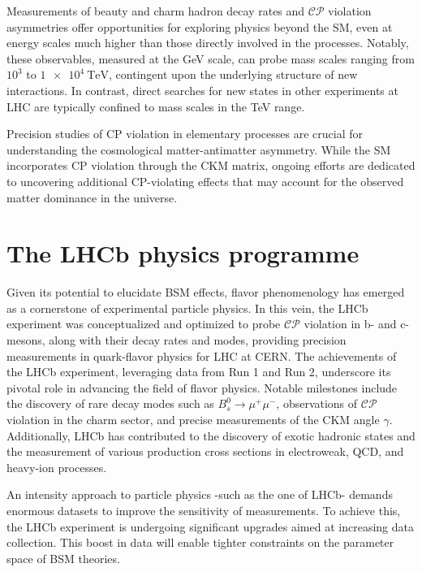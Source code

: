 Measurements of beauty and charm hadron decay rates and $\mathcal{CP}$ violation asymmetries offer opportunities for exploring physics beyond the SM, even at energy scales much higher than those directly involved in the processes. Notably, these observables, measured at the GeV scale, can probe mass scales ranging from $10^3$ to $\SI{1e4}{\tera\eV}$, contingent upon the underlying structure of new interactions\cite{Isidori_2010}. In contrast, direct searches for new states in other experiments at LHC are typically confined to mass scales in the TeV range.

Precision studies of CP violation in elementary processes are crucial for understanding the cosmological matter-antimatter asymmetry. While the SM incorporates CP violation through the CKM matrix, ongoing efforts are dedicated to uncovering additional CP-violating effects that may account for the observed matter dominance in the universe.

\section{The LHCb physics programme}
Given its potential to elucidate BSM effects, flavor phenomenology has emerged as a cornerstone of experimental particle physics. In this vein, the LHCb experiment was conceptualized and optimized to probe $\mathcal{CP}$ violation in b- and c-mesons, along with their decay rates and modes, providing precision measurements in quark-flavor physics for LHC at CERN.
The achievements of the LHCb experiment, leveraging data from Run 1 and Run 2, underscore its pivotal role in advancing the field of flavor physics. Notable milestones include the discovery of rare decay modes such as $B^0_s\rightarrow\mu^+\mu^-$\cite{PhysRevLett.111.101805}, observations of $\mathcal{CP}$ violation in the charm sector\cite{Maccolini:2022y6}, and precise measurements of the CKM angle $\gamma$\cite{Aaij_2016}. Additionally, LHCb has contributed to the discovery of exotic hadronic states\cite{FANG202266, PhysRevLett.115.072001} and the measurement of various production cross sections in electroweak, QCD, and heavy-ion processes\cite{ZBoson, Raab:2815873, Duan:2826531}.


An intensity approach to particle physics -such as the one of LHCb- demands enormous datasets to improve the sensitivity of measurements. To achieve this, the LHCb experiment is undergoing significant upgrades\cite{CERN-LHCC-2021-012} aimed at increasing data collection. This boost in data will enable tighter constraints on the parameter space of BSM theories. 


